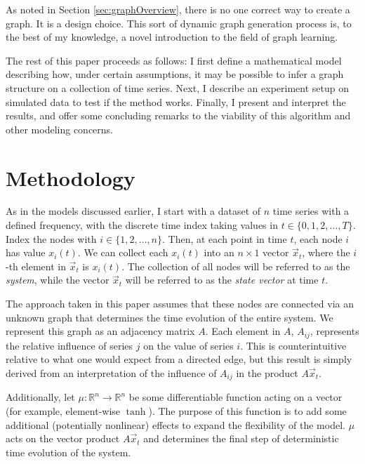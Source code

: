 \documentclass[12pt]{article}
\theoremstyle{definition}
\begin{document}
As noted in Section \ref{sec:graphOverview}, there is no one correct way to create a graph. It is a design choice. This sort of dynamic graph generation process is, to the best of my knowledge, a novel introduction to the field of graph learning.

The rest of this paper proceeds as follows: I first define a mathematical model describing how, under certain assumptions, it may be possible to infer a graph structure on a collection of time series. Next, I describe an experiment setup on simulated data to test if the method works. Finally, I present and interpret the results, and offer some concluding remarks to the viability of this algorithm and other modeling concerns.

\section{Methodology}
\label{sec:methods}

As in the models discussed earlier, I start with a dataset of $n$ time series with a defined frequency, with the discrete time index taking values in $t \in \{0, 1, 2, \ldots, T\}$. Index the nodes with $i \in \{1, 2, \ldots, n\}$. Then, at each point in time $t$, each node $i$ has value $x_i(t)$. We can collect each $x_i(t)$ into an $n \times 1$ vector $\vec{x}_t$, where the $i$-th element in $\vec{x}_t$ is $x_i(t)$. The collection of all nodes will be referred to as the \textit{system}, while the vector $\vec{x}_t$ will be referred to as the \textit{state vector} at time $t$.

The approach taken in this paper assumes that these nodes are connected via an unknown graph that determines the time evolution of the entire system. We represent this graph as an adjacency matrix $A$. Each element in $A$, $A_{ij}$, represents the relative influence of series $j$ on the value of series $i$. This is counterintuitive relative to what one would expect from a directed edge, but this result is simply derived from an interpretation of the influence of $A_{ij}$ in the product $A\vec{x}_t$.

Additionally, let $\mu: \mathbb{R}^n \longrightarrow \mathbb{R}^n$ be some differentiable function acting on a vector (for example, element-wise $\tanh$). The purpose of this function is to add some additional (potentially nonlinear) effects to expand the flexibility of the model. $\mu$ acts on the vector product $A\vec{x}_t$ and determines the final step of deterministic time evolution of the system.
\end{document}
